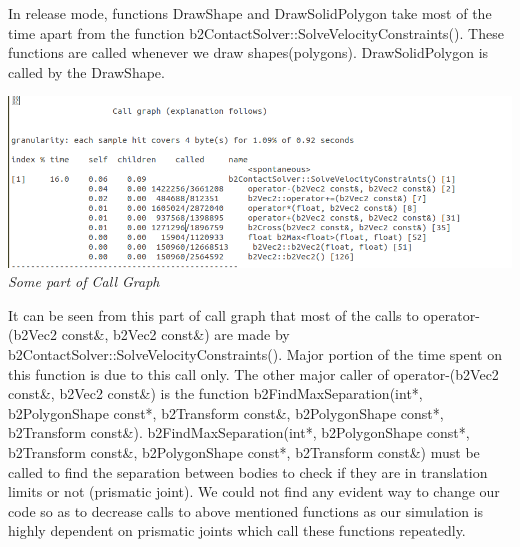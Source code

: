 \documentclass[11pt]{article}
\begin{document}
 In release mode, functions \textsf{DrawShape} and \textsf{DrawSolidPolygon} take most of the time apart from the function \textsf{b2ContactSolver::SolveVelocityConstraints()}. 
 These functions
 are called whenever we draw shapes(polygons). \textsf{DrawSolidPolygon} is called by the \textsf{DrawShape}.\\
 \begin{center}
 \includegraphics[scale=0.5]{images/prof2}
 \it \\Some part of Call Graph
 \end{center}
 It can be seen from this part of call graph that most of the calls to \textsf{operator-(b2Vec2 const\&, b2Vec2 const\&)} are made by \textsf{b2ContactSolver::SolveVelocityConstraints()}.
  Major portion of the time spent on this function is due to this call only. The other major caller of \textsf{operator-(b2Vec2 const\&, b2Vec2 const\&)} 
  is the function \textsf{b2FindMaxSeparation(int*, b2PolygonShape const*, b2Transform const\&, b2PolygonShape const*, b2Transform const\&)}. \textsf{b2FindMaxSeparation(int*, b2PolygonShape const*, b2Transform const\&, b2PolygonShape const*, b2Transform const\&)}
   must be called to find the separation between bodies to check if they are in translation limits or not (prismatic joint).
   We could not find any evident way to change our code so as to decrease calls to above mentioned functions as our simulation is highly dependent on prismatic joints which call
   these functions repeatedly. 
 

 
\end{document}
